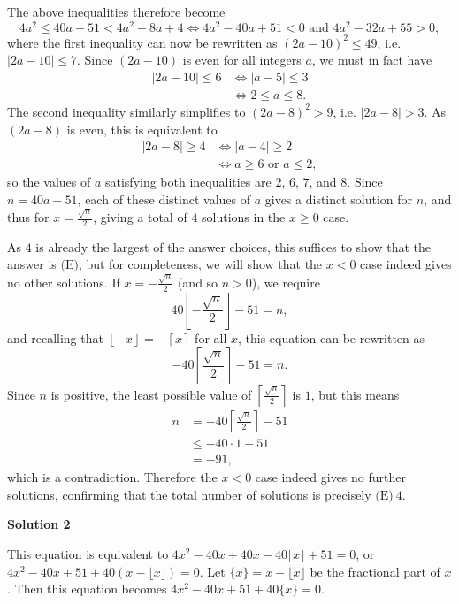 \begin{enumerate}
 The above inequalities therefore become 
 \[4a^2 \leq 40a-51 < 4a^2+8a+4  \iff 4a^2-40a+51 < 0 \text{ and } 4a^2-32a+55 > 0,\] where the first inequality can now be rewritten as $(2a-10)^2 \leq 49$, i.e. $\left\lvert 2a-10\right\rvert \leq 7$. Since $(2a-10)$ is even for all integers $a$, we must in fact have 
 \begin{align*}\left\lvert 2a-10\right\rvert \leq 6 &\iff \left\lvert a-5\right\rvert \leq 3 \\ &\iff 2 \leq a \leq 8.\end{align*}
 The second inequality similarly simplifies to $(2a-8)^2 > 9$, i.e. $\left\lvert 2a-8\right\rvert > 3$. As $(2a-8)$ is even, this is equivalent to 
 \begin{align*}\left\lvert 2a-8 \right\rvert \geq 4 &\iff \left\lvert a-4\right\rvert \geq 2 \\ &\iff a \geq 6 \text{ or } a \leq 2,\end{align*}
 so the values of $a$ satisfying both inequalities are $2$, $6$, $7$, and $8$. Since $n = 40a-51$, each of these distinct values of $a$ gives a distinct solution for $n$, and thus for $x = \frac{\sqrt{n}}{2}$, giving a total of $4$ solutions in the $x \geq 0$ case.

 
As $4$ is already the largest of the answer choices, this suffices to show that the answer is $\text{(E)}$, but for completeness, we will show that the $x < 0$ case indeed gives no other solutions. If $x = -\frac{\sqrt{n}}{2}$ (and so $n > 0$), we require 
 \[40\left\lfloor -\frac{\sqrt{n}}{2}\right\rfloor-51 = n,\] and recalling that $\left\lfloor -x\right\rfloor = -\left\lceil x\right\rceil$ for all $x$, this equation can be rewritten as 
 \[-40\left\lceil \frac{\sqrt{n}}{2}\right\rceil-51 = n.\] Since $n$ is positive, the least possible value of $\left\lceil \frac{\sqrt{n}}{2}\right\rceil$ is $1$, but this means 
 \begin{align*}n &= -40\left\lceil\frac{\sqrt{n}}{2}\right\rceil-51 \\ &\leq -40 \cdot 1 - 51 \\ &= -91,\end{align*}
 which is a contradiction. Therefore the $x < 0$ case indeed gives no further solutions, confirming that the total number of solutions is precisely $\boxed{\text{(E)} \ 4}$.

 



\textbf{Solution 2}

This equation is equivalent to $4x^2 - 40x + 40x - 40\lfloor x \rfloor + 51 = 0$, or $4x^2 - 40x + 51 + 40(x - \lfloor x \rfloor) = 0$.  Let $\{x\} = x - \lfloor x \rfloor$ be the fractional part of $x$.  Then this equation becomes $4x^2 - 40x + 51 + 40\{x\} = 0$.


\end{enumerate}
